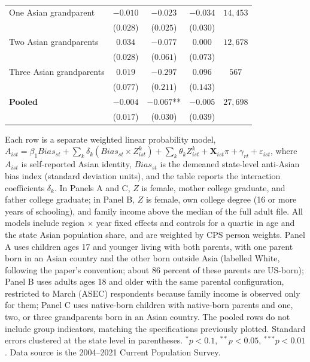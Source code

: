 \documentclass[12pt,english]{article}
\providecommand{\DIFaddtex}[1]{{\protect\color{blue}\uwave{#1}}} %
\providecommand{\DIFaddFL}[1]{\DIFadd{#1}} %
\providecommand{\DIFadd}[1]{\texorpdfstring{\DIFaddtex{#1}}{#1}} %
\begin{document}
\begin{table}[H]
{\begin{threeparttable}
\begin{tabular}{lcccc}
\midrule
One Asian grandparent & $-0.010$ & $-0.023$ & $-0.034$ & $14{,}453$ \\
 & ($0.028$) & ($0.025$) & ($0.030$) & \\
Two Asian grandparents & $0.034$ & $-0.077$ & $0.000$ & $12{,}678$ \\
 & ($0.028$) & ($0.061$) & ($0.073$) & \\
Three Asian grandparents & $0.019$ & $-0.297$ & $0.096$ & $567$ \\
 & ($0.077$) & ($0.211$) & ($0.143$) & \\
\textbf{Pooled} & $-0.004$ & $-0.067$** & $-0.005$ & $27{,}698$ \\
 & ($0.017$) & ($0.030$) & ($0.039$) & \\
\bottomrule
\end{tabular}
\begin{tablenotes}
\small
\item[\DIFaddFL{1}] \footnotesize{Each row is a separate weighted linear probability model, $A_{ist} = \beta_1 Bias_{st} + \sum_k \delta_k (Bias_{st} \times Z_{ist}^k) + \sum_k \theta_k Z_{ist}^k + \mathbf{X}_{ist}\pi + \gamma_{rt} + \varepsilon_{ist}$, where $A_{ist}$ is self-reported Asian identity, $Bias_{st}$ is the demeaned state-level anti-Asian bias index (standard deviation units), and the table reports the interaction coefficients $\delta_k$. In Panels A and C, $Z$ is female, mother college graduate, and father college graduate; in Panel B, $Z$ is female, own college degree (16 or more years of schooling), and family income above the median of the full adult file. All models include region $\times$ year fixed effects and controls for a quartic in age and the state Asian population share, and are weighted by CPS person weights. Panel A uses children ages 17 and younger living with both parents, with one parent born in an Asian country and the other born outside Asia (labelled White, following the paper's convention; about 86 percent of these parents are US-born); Panel B uses adults ages 18 and older with the same parental configuration, restricted to March (ASEC) respondents because family income is observed only for them; Panel C uses native-born children with native-born parents and one, two, or three grandparents born in an Asian country. The pooled rows do not include group indicators, matching the specifications previously plotted. Standard errors clustered at the state level in parentheses. $^{*}p<0.1$, $^{**}p<0.05$, $^{***}p<0.01$. Data source is the 2004--2021 Current Population Survey.}
\end{tablenotes}
\end{threeparttable}}
\end{table}
\end{document}

